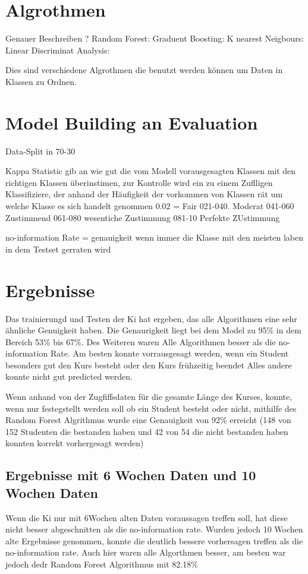 \section{Algrothmen}
Genauer Beschreiben ?
Random Forest:
Graduent Boosting:
K nearest Neigbours:
Linear Discriminat Analysis:

Dies sind verschiedene Algrothmen die benutzt werden können um Daten in Klassen zu Ordnen.

\section{Model Building an Evaluation}
Data-Split in 70-30

Kappa Statistic gib an wie gut die vom Modell vorausgesagten Klassen mit den richtigen Klassen überinstimen, zur Kontrolle wird ein  
zu einem Zuflligen Klassifiziere, der anhand der Häufigkeit der vorkommen von Klassen rät um welche Klasse es sich handelt genommen
0.02 = Fair
021-040. Moderat
041-060 Zustimmend
061-080 wesentiche Zustimmung
081-10 Perfekte ZUstimmung

no-information Rate = genauigkeit wenn immer die Klasse mit den meisten laben in dem Testset gerraten wird

\section{Ergebnisse}
Das trainierungd und Testen der Ki hat ergeben, das alle Algorithmen eine sehr ähnliche Genuigkeit haben.
Die Genaurigkeit liegt bei dem Model zu 95\% in dem Bereich 53\% bis 67\%. Des Weiteren waren Alle
Algorithmen besser als die no-information Rate. Am besten konnte vorrausgesagt werden, wenn ein Student besonders gut den Kurs besteht oder den Kurs frühzeitig beendet
Alles andere konnte nicht gut predicted werden.

Wenn anhand von der Zugfiffsdaten für die gesamte Länge des Kurses, konnte, wenn nur festegstellt werden soll
ob ein Student besteht oder nicht, mithilfe des Random Forest Algrithmus wurde eine Genauigkeit von 92\% erreicht
(148 von 152 Studenten die bestanden haben und 42 von 54 die nicht bestanden haben konnten korrekt vorhergesagt werden)

\subsection{Ergebnisse mit 6 Wochen Daten und 10 Wochen Daten}
Wenn die Ki nur mit 6Wochen alten Daten voraussagen treffen soll,
hat diese nicht besser abgeschnitten als die no-information rate.
Wurden jedoch 10 Wochen alte Ergebnisse genommen, konnte die deutlich bessere
vorhersagen treffen als die no-information rate. Auch hier waren alle Algorthmen besser,
am besten war jedoch dedr Random Forest Algorithmus mit 82.18\%

